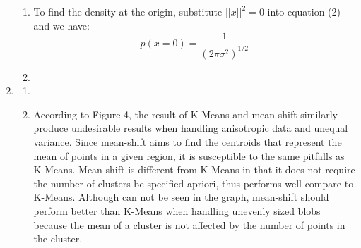 \documentclass{article}
\begin{document}
\begin{enumerate}
\begin{enumerate}
    \item
        To find the density at the origin, substitute $||x||^2 = 0$ into equation (2) and we have:
    \begin{equation}
        p(x = 0) = \frac{1}{(2\pi\sigma^2)^{1/2}}
    \end{equation}
    \item
    \end{enumerate}
\item
    \begin{enumerate}
    \item
    \item
        According to Figure 4, the result of K-Means and mean-shift similarly produce undesirable results when handling anisotropic data and unequal variance. Since mean-shift aims to find the centroids that represent the mean of points in a given region, it is susceptible to the same pitfalls as K-Means. Mean-shift is different from K-Means in that it does not require the number of clusters be specified apriori, thus performs well compare to K-Means. Although can not be seen in the graph, mean-shift should perform better than K-Means when handling unevenly sized blobs because the mean of a cluster is not affected by the number of points in the cluster.
    \end{enumerate}
\end{enumerate}
\end{document}
